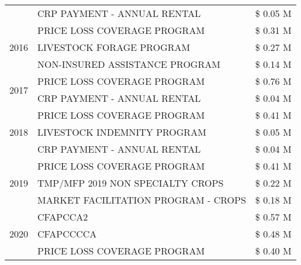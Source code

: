 \begin{tabular}{llr}
 & CRP PAYMENT - ANNUAL RENTAL & \$ 0.05 M \\
\cline{1-3}
\multirow[t]{3}{*}{2016} & PRICE LOSS COVERAGE PROGRAM                   & \$ 0.31 M \\
 & LIVESTOCK FORAGE PROGRAM                      & \$ 0.27 M \\
 & NON-INSURED ASSISTANCE PROGRAM                & \$ 0.14 M \\
\cline{1-3}
\multirow[t]{2}{*}{2017} & PRICE LOSS COVERAGE PROGRAM & \$ 0.76 M \\
 & CRP PAYMENT - ANNUAL RENTAL & \$ 0.04 M \\
\cline{1-3}
\multirow[t]{3}{*}{2018} & PRICE LOSS COVERAGE PROGRAM & \$ 0.41 M \\
 & LIVESTOCK INDEMNITY PROGRAM & \$ 0.05 M \\
 & CRP PAYMENT - ANNUAL RENTAL & \$ 0.04 M \\
\cline{1-3}
\multirow[t]{3}{*}{2019} & PRICE LOSS COVERAGE PROGRAM & \$ 0.41 M \\
 & TMP/MFP 2019 NON SPECIALTY CROPS & \$ 0.22 M \\
 & MARKET FACILITATION PROGRAM - CROPS & \$ 0.18 M \\
\cline{1-3}
\multirow[t]{3}{*}{2020} & CFAPCCA2 & \$ 0.57 M \\
 & CFAPCCCCA & \$ 0.48 M \\
 & PRICE LOSS COVERAGE PROGRAM & \$ 0.40 M \\
\cline{1-3}
\bottomrule
\end{tabular}
